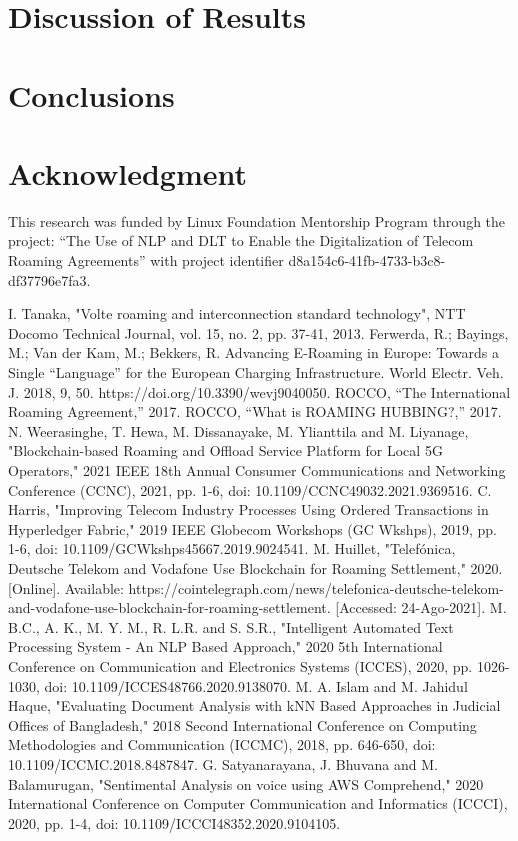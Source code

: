 \documentclass[conference]{style/IEEEtran}
\begin{document}
\section{Discussion of Results}

\section{Conclusions}

\section*{Acknowledgment}
This research was funded by Linux Foundation Mentorship Program through the project: “The Use of NLP and DLT to Enable the Digitalization of Telecom Roaming Agreements” with project identifier d8a154c6-41fb-4733-b3c8-df37796e7fa3.

\begin{thebibliography}{00}
 I. Tanaka, "Volte roaming and interconnection standard technology", NTT Docomo Technical Journal, vol. 15, no. 2, pp. 37-41, 2013.
 Ferwerda, R.; Bayings, M.; Van der Kam, M.; Bekkers, R. Advancing E-Roaming in Europe: Towards a Single “Language” for the European Charging Infrastructure. World Electr. Veh. J. 2018, 9, 50. https://doi.org/10.3390/wevj9040050.
 ROCCO, “The International Roaming Agreement,” 2017.
 ROCCO, “What is ROAMING HUBBING?,” 2017.
 N. Weerasinghe, T. Hewa, M. Dissanayake, M. Ylianttila and M. Liyanage, "Blockchain-based Roaming and Offload Service Platform for Local 5G Operators," 2021 IEEE 18th Annual Consumer Communications and Networking Conference (CCNC), 2021, pp. 1-6, doi: 10.1109/CCNC49032.2021.9369516.
 C. Harris, "Improving Telecom Industry Processes Using Ordered Transactions in Hyperledger Fabric," 2019 IEEE Globecom Workshops (GC Wkshps), 2019, pp. 1-6, doi: 10.1109/GCWkshps45667.2019.9024541.
 M. Huillet, "Telefónica, Deutsche Telekom and Vodafone Use Blockchain for Roaming Settlement," 2020. [Online]. Available: https://cointelegraph.com/news/telefonica-deutsche-telekom-and-vodafone-use-blockchain-for-roaming-settlement. [Accessed: 24-Ago-2021].
 M. B.C., A. K., M. Y. M., R. L.R. and S. S.R., "Intelligent Automated Text Processing System - An NLP Based Approach," 2020 5th International Conference on Communication and Electronics Systems (ICCES), 2020, pp. 1026-1030, doi: 10.1109/ICCES48766.2020.9138070.
 M. A. Islam and M. Jahidul Haque, "Evaluating Document Analysis with kNN Based Approaches in Judicial Offices of Bangladesh," 2018 Second International Conference on Computing Methodologies and Communication (ICCMC), 2018, pp. 646-650, doi: 10.1109/ICCMC.2018.8487847.
 G. Satyanarayana, J. Bhuvana and M. Balamurugan, "Sentimental Analysis on voice using AWS Comprehend," 2020 International Conference on Computer Communication and Informatics (ICCCI), 2020, pp. 1-4, doi: 10.1109/ICCCI48352.2020.9104105.
\end{thebibliography}
\vspace{12pt}
\end{document}
